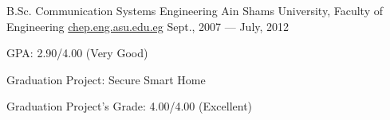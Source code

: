 


\begin{cventries}

  \cventry
    {B.Sc. Communication Systems Engineering} %
    {Ain Shams University, Faculty of Engineering} %
    {\href{http://chep.eng.asu.edu.eg} {chep.eng.asu.edu.eg}} %
    {Sept., 2007 — July, 2012} %
    {
        \begin{cvitems}
            \item {GPA: 2.90/4.00 (Very Good)}
            \item {Graduation Project: Secure Smart Home}
            \item {Graduation Project's Grade: 4.00/4.00 (Excellent)}
        \end{cvitems}
    }


\end{cventries}


